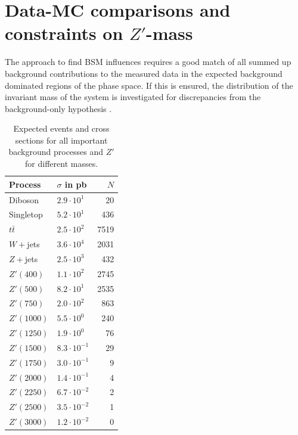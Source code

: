
\section{Data-MC comparisons and constraints on $Z'$-mass}
The approach to find BSM influences requires a good match of all summed up background contributions to the measured data in the expected background
dominated regions of the phase space. If this is ensured, the distribution of the invariant mass of the system is investigated for discrepancies 
from the background-only hypothesis \cite{anl}. 
\begin{table}[b]
 \begin{tabular}{l|l|r}
 Process & $\sigma$ in pb & $N$\\
 \hline
Diboson &$2.9\cdot 10^{1}$& 20 \\
Singletop&$5.2\cdot 10^{1}$& 436\\
$t\bar t$&$2.5\cdot 10^{2}$& 7519\\
$W+$jets&$3.6\cdot 10^{4}$& 2031\\
$Z+$jets&$2.5\cdot 10^{3}$& 432\\
\hline
$Z'(400)$&$1.1\cdot 10^{2}$& 2745\\
$Z'(500)$&$8.2\cdot 10^{1}$& 2535\\
$Z'(750)$&$2.0\cdot 10^{2}$& 863\\
$Z'(1000)$&$5.5\cdot 10^{0}$& 240\\
$Z'(1250)$&$1.9\cdot 10^{0}$& 76\\
$Z'(1500)$&$8.3\cdot 10^{-1}$& 29\\
$Z'(1750)$&$3.0\cdot 10^{-1}$& 9\\
$Z'(2000)$&$1.4\cdot 10^{-1}$& 4\\
$Z'(2250)$&$6.7\cdot 10^{-2}$& 2\\
$Z'(2500)$&$3.5\cdot 10^{-2}$& 1\\
$Z'(3000)$&$1.2\cdot 10^{-2}$& 0
 \end{tabular}
 \caption{\small{Expected events and cross sections for all important background processes and $Z'$ for different masses.}}
 \label{tab:expEvents}
\end{table}


